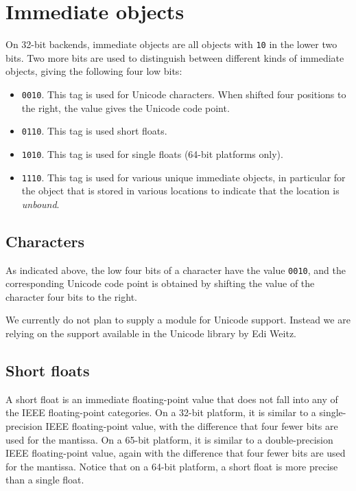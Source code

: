 \section{Immediate objects}

On 32-bit backends, immediate objects are all objects with \texttt{10}
in the lower two bits.  Two more bits are used to distinguish between
different kinds of immediate objects, giving the following four low
bits:

\begin{itemize}
\item \texttt{0010}.  This tag is used for Unicode characters.  When
  shifted four positions to the right, the value gives the Unicode
  code point. 
\item \texttt{0110}.  This tag is used short floats.  
\item \texttt{1010}.  This tag is used for single floats (64-bit
  platforms only). 
\item \texttt{1110}.  This tag is used for various unique immediate
  objects, in particular for the object that is stored in various
  locations to indicate that the location is \emph{unbound}. 
\end{itemize}

\subsection{Characters}

As indicated above, the low four bits of a character have the value
\texttt{0010}, and the corresponding Unicode code point is obtained by
shifting the value of the character four bits to the right. 

We currently do not plan to supply a module for Unicode support.
Instead we are relying on the support available in the Unicode library
by Edi Weitz.

\subsection{Short floats}

A short float is an immediate floating-point value that does not fall
into any of the IEEE floating-point categories.  On a 32-bit platform,
it is similar to a single-precision IEEE floating-point value, with
the difference that four fewer bits are used for the mantissa.  On a
65-bit platform, it is similar to a double-precision IEEE
floating-point value, again with the difference that four fewer bits
are used for the mantissa.  Notice that on a 64-bit platform, a short
float is more precise than a single float. 


